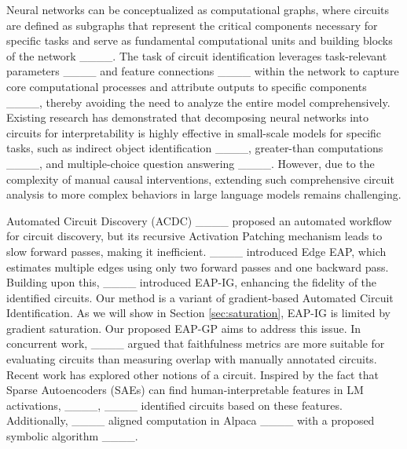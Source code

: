 Neural networks can be conceptualized as computational graphs, where circuits are defined as subgraphs that represent the critical components necessary for specific tasks and serve as fundamental computational units and building blocks of the network ____. The task of circuit identification leverages task-relevant parameters ____ and feature connections ____ within the network to capture core computational processes and attribute outputs to specific components ____, thereby avoiding the need to analyze the entire model comprehensively. Existing research has demonstrated that decomposing neural networks into circuits for interpretability is highly effective in small-scale models for specific tasks, such as indirect object identification ____, greater-than computations ____, and multiple-choice question answering ____. However, due to the complexity of manual causal interventions, extending such comprehensive circuit analysis to more complex behaviors in large language models remains challenging.

Automated Circuit Discovery (ACDC) ____ proposed an automated workflow for circuit discovery, but its recursive Activation Patching mechanism leads to slow forward passes, making it inefficient. ____ introduced Edge EAP, which estimates multiple edges using only two forward passes and one backward pass. Building upon this, ____ introduced EAP-IG, enhancing the fidelity of the identified circuits.  Our method is a variant of gradient-based Automated Circuit Identification. 
As we will show in Section \ref{sec:saturation}, EAP-IG is limited by gradient saturation. Our proposed EAP-GP aims to address this issue.
In concurrent work, ____ argued that faithfulness metrics are more suitable for evaluating circuits than measuring overlap with manually annotated circuits. Recent work has explored other notions of a circuit. Inspired by the fact that Sparse Autoencoders (SAEs) can find human-interpretable features in LM activations, ____, ____ identified circuits based on these features. Additionally, ____ aligned computation in Alpaca ____ with a proposed symbolic algorithm ____.